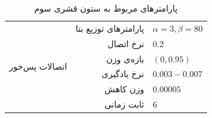 \documentclass[12pt]{report}
\begin{document}
\begin{table}[p]
{\begin{tabular}{|rrrl|}
\multicolumn{1}{|r|}{\multirow{6}{*}{اتصالات پس‌خور}}        & \multicolumn{2}{r|}{پارامتر‌های توزیع بتا}                                                                         & $\alpha=3, \beta=80$               \\ \cline{2-4} 
\multicolumn{1}{|r|}{}                                          & \multicolumn{2}{r|}{نرخ اتصال}                                                                                     & $0.2$                     \\ \cline{2-4} 
\multicolumn{1}{|r|}{}                                          & \multicolumn{2}{r|}{بازه‌ی وزن}                                                                                    & $(0, 0.95)$               \\ \cline{2-4} 
\multicolumn{1}{|r|}{}                                          & \multicolumn{2}{r|}{نرخ یادگیری}                                                                                   &    $0.003 - 0.007$        \\ \cline{2-4} 
\multicolumn{1}{|r|}{}                                          & \multicolumn{2}{r|}{وزن کاهش}                                                                                      & $0.00005$                \\ \cline{2-4} 
\multicolumn{1}{|r|}{}                                          & \multicolumn{2}{r|}{ثابت زمانی}                                                                                    & $6$                       \\ \hline
	\end{tabular}}
\caption{\label{table:parameters-cc-3}پارامتر‌های مربوط به ستون قشری سوم}
\end{table}
\end{document}
